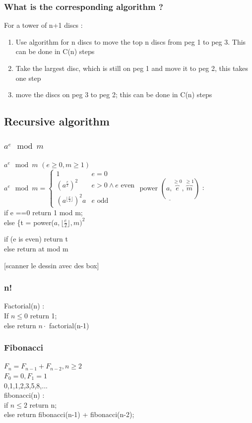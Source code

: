 \documentclass[12pt,a4paper]{article}
\begin{document}
\subsubsection{What is the corresponding algorithm ?}
For a tower of n+1 discs :
\begin{enumerate}
\item Use algorithm for n discs to move the top n discs from peg 1 to peg 3. This can be done in C(n) steps
\item Take the largest disc, which is still on peg 1 and move it to peg 2, this takes one step
\item move the discs on peg 3 to peg 2; this can be done in C(n) steps
\end{enumerate}
\subsection{Recursive algorithm}
\subsubsection{$a^e \mod m$}
\underline{$a^e \mod m$} $(e \geq 0, m \geq 1)$\\
$a^e \mod m = 
\left\{
\begin{array}{ll}
1 & e=0\\
(a^{\frac{e}{2}})^2 & e > 0 \wedge e \mbox{ even}\\
(a^{\lfloor\frac{e}{2}\rfloor})^2a & e \mbox{ odd}
\end{array}
\right.
$
$\underline{\mbox{power } (a, \overbrace{e}^{\geq 0}, \overbrace{m}^{\geq 1})}$ : \\
if e ==0 return  1 mod m;\\
else \{t = power($a, \lfloor\frac{e}{2}\rfloor, m)^2$

if (e is even) return t\\
else return at mod m

[scanner le dessin avec des box]
\subsubsection{n!}
Factorial(n) :\\
If $n \leq 0$ return 1;\\
else return $n\cdot$ factorial(n-1)
\subsubsection{Fibonacci}
$F_n = F_{n-1} + F_{n-2}, n \geq 2$\\
$F_0 = 0, F_1 = 1$\\
0,1,1,2,3,5,8,...\\
fibonacci(n) :\\
if $n \leq 2$ return n;\\
else return fibonacci(n-1) + fibonacci(n-2);
\end{document}
